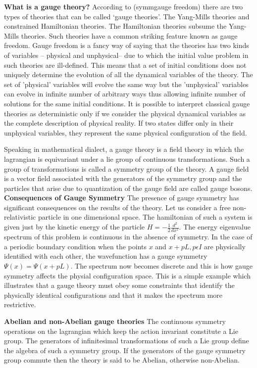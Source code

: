 \begin{description}
 \textbf{What is a gauge theory?}
 According to (symmgauge freedom) there are two types of theories that can be called \lq gauge theories\rq. The Yang-Mills theories and constrained Hamiltonian theories. The Hamiltonian theories subsume the Yang-Mills theories. Such theories have a common striking feature known as gauge freedom. Gauge freedom is a fancy way of saying that the theories has two kinds of variables -- physical and unphysical-- due to which the initial value problem in such theories are ill-defined. This means that a set of initial conditions does not uniquely determine the evolution of all the dynamical variables of the theory. The set of 'physical' variables will evolve the same way but the 'unphysical' variables can evolve in infinite number of arbitrary ways thus allowing infinite number of solutions for the same initial conditions. It is possible to interpret classical gauge theories as deterministic only if we consider the physical dynamical variables as the complete description of physical reality. If two states differ only in their unphysical variables, they represent the same physical configuration of the field.

Speaking in mathematical dialect, a gauge theory is a field theory in which the lagrangian is equivariant under a lie group of continuous transformations. Such a group of transformations is called a symmetry group of the theory. A gauge field is a vector field associated with the generators of the symmetry group and the particles that arise due to quantization of the gauge field are called gauge bosons.\\
\textbf{Consequences of Gauge Symmetry}
The presence of gauge symmetry has significant consequences on the results of the theory. Let us consider a free non-relativistic particle in one dimensional space. The hamiltonian of such a system is given just by the kinetic energy of the particle $ H= -\frac{1}{2} \frac{d^{2}}{dx^{2}} $. The energy eigenvalue spectrum of this problem is continuous in the absence of symmetry. In the case of a periodic boundary condition when the points $x$ and $ x+pL, p \epsilon I $ are physically identified with each other, the wavefunction has a gauge symmetry $\Psi(x)=\Psi(x+pL)$. The spectrum now becomes discrete and this is how gauge symmetry affects the physial configuration space. This is a simple example which illustrates that a gauge theory must obey some constraints that identify the physically identical configurations and that it makes the spectrum more restrictive.

\textbf{Abelian and non-Abelian gauge theories}
The continuous symmetry operations on the lagrangian which keep the action invariant constitute a Lie group. The generators of infinitesimal transformations of such a Lie group define the algebra of such a symmetry group. If the generators of the gauge symmetry group commute then the theory is said to be Abelian, otherwise non-Abelian.


\end{description}
